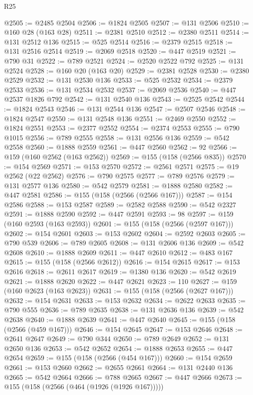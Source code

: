 \begin{lexlean}{R25}
\begin{coremodule}
@2505 := @2485 @2504
@2506 := @1824 @2505
@2507 := @131 @2506
@2510 := @160 @28 (@163 @28)
@2511 := @2381 @2510
@2512 := @2380 @2511
@2514 := @131 @2512 @136
@2515 := @525 @2514
@2516 := @2379 @2515
@2518 := @131 @2516 @2514
@2519 := @2069 @2518
@2520 := @447 @2519
@2521 := @790 @31
@2522 := @789 @2521
@2524 := @2520 @2522 @792
@2525 := @131 @2524
@2528 := @160 @20 (@163 @20)
@2529 := @2381 @2528
@2530 := @2380 @2529
@2532 := @131 @2530 @136
@2533 := @525 @2532
@2534 := @2379 @2533
@2536 := @131 @2534 @2532
@2537 := @2069 @2536
@2540 := @447 @2537 @1826 @792
@2542 := @131 @2540 @136
@2543 := @2525 @2542
@2544 := @1824 @2543
@2546 := @131 @2544 @136
@2547 := @2507 @2546
@2548 := @1824 @2547
@2550 := @131 @2548 @136
@2551 := @2469 @2550
@2552 := @1824 @2551
@2553 := @2377 @2552
@2554 := @2374 @2553
@2555 := @790 @1015
@2556 := @789 @2555
@2558 := @131 @2556 @136
@2559 := @542 @2558
@2560 := @1888 @2559
@2561 := @447 @2560
@2562 := 92
@2566 := @159 (@160 @2562 (@163 @2562))
@2569 := @155 (@158 (@2566 @835))
@2570 := @154 @2569
@2571 := @153 @2570
@2572 := @2561 @2571
@2575 := @19 @2562 (@22 @2562)
@2576 := @790 @2575
@2577 := @789 @2576
@2579 := @131 @2577 @136
@2580 := @542 @2579
@2581 := @1888 @2580
@2582 := @447 @2581
@2586 := @155 (@158 (@2566 (@2566 @167)))
@2587 := @154 @2586
@2588 := @153 @2587
@2589 := @2582 @2588
@2590 := @542 @2327
@2591 := @1888 @2590
@2592 := @447 @2591
@2593 := 98
@2597 := @159 (@160 @2593 (@163 @2593))
@2601 := @155 (@158 (@2566 (@2597 @167)))
@2602 := @154 @2601
@2603 := @153 @2602
@2604 := @2592 @2603
@2605 := @790 @539
@2606 := @789 @2605
@2608 := @131 @2606 @136
@2609 := @542 @2608
@2610 := @1888 @2609
@2611 := @447 @2610
@2612 := @483 @167
@2615 := @155 (@158 (@2566 @2612))
@2616 := @154 @2615
@2617 := @153 @2616
@2618 := @2611 @2617
@2619 := @1380 @136
@2620 := @542 @2619
@2621 := @1888 @2620
@2622 := @447 @2621
@2623 := 110
@2627 := @159 (@160 @2623 (@163 @2623))
@2631 := @155 (@158 (@2566 (@2627 @167)))
@2632 := @154 @2631
@2633 := @153 @2632
@2634 := @2622 @2633
@2635 := @790 @555
@2636 := @789 @2635
@2638 := @131 @2636 @136
@2639 := @542 @2638
@2640 := @1888 @2639
@2641 := @447 @2640
@2645 := @155 (@158 (@2566 (@459 @167)))
@2646 := @154 @2645
@2647 := @153 @2646
@2648 := @2641 @2647
@2649 := @790 @344
@2650 := @789 @2649
@2652 := @131 @2650 @136
@2653 := @542 @2652
@2654 := @1888 @2653
@2655 := @447 @2654
@2659 := @155 (@158 (@2566 (@454 @167)))
@2660 := @154 @2659
@2661 := @153 @2660
@2662 := @2655 @2661
@2664 := @131 @2440 @136
@2665 := @542 @2664
@2666 := @788 @2665
@2667 := @447 @2666
@2673 := @155 (@158 (@2566 (@464 (@1926 (@1926 @167)))))

\end{coremodule}
\end{lexlean}
